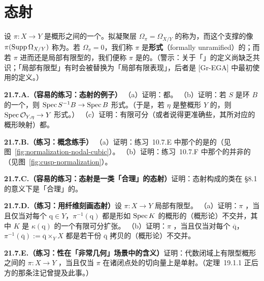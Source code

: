
\section{\trUnramified{}态射}

设 $\pi\colon X\to Y$ 是概形之间的一个\trMorphism。拟凝聚层 $\Omega_\pi=\Omega_{X/Y}$ 的\trSupport{}称为\trRamificationLocus，而这个支撑的像 $\pi(\operatorname{Supp}\Omega_{X/Y})$ 称为\trBranchLocus。若 $\Omega_\pi=0$，我们称 $\pi$ 是\textbf{形式\trUnramified}（formally unramified）的；而若 $\pi$ 进而还是局部有限型的，我们便称 $\pi$ 是\trUnramified{}的。（警示：关于「\trUnramified」的定义尚缺乏共识；「局部有限型」有时会被替换为「局部有限表现」，后者是 [Gr-EGA] 中最初使用的定义。）

\textbf{21.7.A.（容易的练习：\trUnramified{}态射的例子）}\quad
（a）证明：\trLocallyClosedEmbedding{}都\trUnramified。
（b）证明：若 $S$ 是环 $B$ 的一个\trMultiplicativeSubset，则 $\operatorname{Spec} S^{-1}B\to\operatorname{Spec} B$ 形式\trUnramified。（于是，若 $\eta$ 是整概形 $Y$ 的\trGenericPoint，则 $\operatorname{Spec}\mathcal{O}_{Y,\eta}\to Y$ 形式\trUnramified。）
（c）证明：有限可分\trFieldExtension（或者说得更准确些，其所对应的概形映射）都\trUnramified。

\textbf{21.7.B.（练习：概念练手）}\quad
（a）证明：\mbox{练习~10.7.E} 中那个\trNode{}的\trNormalization{}是\trUnramified{}的（见图~\ref{fig:normalization-nodal-cubic}）。
（b）证明：\mbox{练习~10.7.F} 中那个\trCusp{}的\trNormalization{}并非\trUnramified{}的（见图~\ref{fig:cusp-normalization}）。

\textbf{21.7.C.（容易的练习：\trUnramified{}态射是一类「合理」的态射）}\quad 证明：\trUnramified{}态射构成的类在 \S8.1 的意义下是「合理」的。

\textbf{21.7.D.（练习：用纤维刻画\trUnramified{}态射）}\quad 设 $\pi\colon X\to Y$ 局部有限型。
（a）证明：$\pi$ \trUnramified，当且仅当对每个 $\mathrm{q}\in Y$，$\pi^{-1}(\mathrm{q})$ 都是形如 $\operatorname{Spec} K$ 的概形的（概形论）不交并，其中 $K$ 是 $\kappa(\mathrm{q})$ 的一个有限可分扩张。
（b）证明：$\pi$ \trUnramified，当且仅当对每个\trGeometricPoint{} $\overline{\mathrm{q}}$，$\pi^{-1}(\overline{\mathrm{q}}):=\overline{\mathrm{q}}\times_Y X$ 都是若干份 $\overline{\mathrm{q}}$ 拷贝的（概形论）不交并。

\textbf{21.7.E.（练习：\trUnramified{}性在「非常几何」场景中的含义）}\quad 证明：代数闭域上有限型概形之间的\trMorphism{} $\pi\colon X\to Y$ \trUnramified，当且仅当 $\pi$ 在诸闭点处的切向量上是单射。（\mbox{定理~19.1.1} 正后方的那条注记曾提及此事。）

